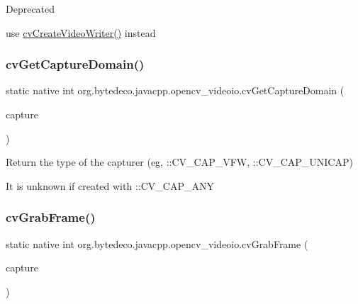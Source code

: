 \begin{DoxyRefDesc}{Deprecated}
\item[\hyperlink{deprecated__deprecated000004}{Deprecated}]use \hyperlink{group__videoio__c_ga707349ac4c6f16cecf119295374d1ef8}{cv\+Create\+Video\+Writer()} instead \end{DoxyRefDesc}
\mbox{\label{group__videoio__c_ga907965e3aedaeeb293f6b781590fa8a9}} 
\subsubsection{\texorpdfstring{cv\+Get\+Capture\+Domain()}{cvGetCaptureDomain()}}
{\footnotesize\ttfamily static native int org.\+bytedeco.\+javacpp.\+opencv\+\_\+videoio.\+cv\+Get\+Capture\+Domain (\begin{DoxyParamCaption}\item[{Cv\+Capture}]{capture }\end{DoxyParamCaption})\hspace{0.3cm}{\ttfamily [static]}}



Return the type of the capturer (eg, \+::\+C\+V\+\_\+\+C\+A\+P\+\_\+\+V\+FW, \+::\+C\+V\+\_\+\+C\+A\+P\+\_\+\+U\+N\+I\+C\+AP) 

It is unknown if created with \+::\+C\+V\+\_\+\+C\+A\+P\+\_\+\+A\+NY \mbox{\label{group__videoio__c_ga630e4d9ab3ff9f05ab4bc5ba1eb1d787}} 
\subsubsection{\texorpdfstring{cv\+Grab\+Frame()}{cvGrabFrame()}}
{\footnotesize\ttfamily static native int org.\+bytedeco.\+javacpp.\+opencv\+\_\+videoio.\+cv\+Grab\+Frame (\begin{DoxyParamCaption}\item[{Cv\+Capture}]{capture }\end{DoxyParamCaption})\hspace{0.3cm}{\ttfamily [static]}}



